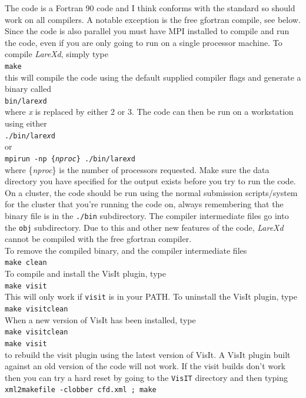 \documentclass[11pt]{article}
\begin{document}
The code is a Fortran 90 code and I think conforms with the standard so should work on all compilers. A notable exception is the free gfortran compile, see below. Since the code is also parallel you must have MPI installed to compile and run the code, even if you are only going to run on a single processor machine.
To compile {\it LareXd}, simply type\\
\texttt{make}\\
this will compile the code using the default supplied compiler flags and generate a binary called\\
\texttt{bin/lare{\it x}d}\\
where {\it x} is replaced by either 2 or 3. The code can then be run on a workstation using either\\
\texttt{./bin/lare{\it x}d}\\
or\\
\texttt{mpirun -np \{{\it nproc}\} ./bin/lare{\it x}d}\\
where \{{\it nproc}\} is the number of processors requested. Make sure the data directory you have specified for the output exists
before you try to run the code. On a cluster, the
code should be run using the normal submission scripts/system for the cluster
that you're running the code on, always remembering that the binary file is in
the \texttt{./bin} subdirectory. The compiler intermediate files go into the
\texttt{obj} subdirectory. Due to this and other new features of the code,
{\it LareXd} cannot be compiled with the free gfortran compiler.\\

To remove the compiled binary, and the compiler intermediate files\\
\texttt{make clean}\\
To compile and install the VisIt plugin, type\\
\texttt{make visit}\\
This will only work if \texttt{visit} is in your PATH. To uninstall the VisIt plugin, type\\
\texttt{make visitclean}\\
When a new version of VisIt has been installed, type\\
\texttt{make visitclean}\\
\texttt{make visit}\\
to rebuild the visit plugin using the latest version of VisIt. A VisIt plugin built against an old version of the code will not work. If the visit builds don't work then you can try a hard reset by going to the \texttt{VisIT} directory and then typing\\
 \texttt{xml2makefile -clobber cfd.xml ; make}
\end{document}
